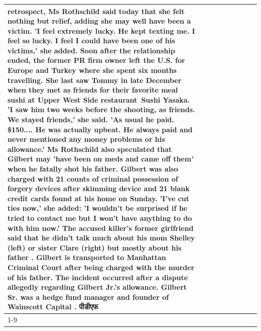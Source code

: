 \begin{table}[H]
\begin{tabular}{lllrlllll}
retrospect, Ms Rothschild said today that she felt nothing but relief, adding she may well have been a victim. 'I feel extremely lucky. He kept texting me. I feel so lucky. I feel I could have been one of his victims,' she added. Soon after the relationship ended, the former PR firm owner left the U.S. for Europe and Turkey where she spent six months  travelling. She last saw Tommy in late December when they met as friends for their favorite meal sushi at Upper West Side restaurant Sushi Yasaka. 'I saw him two weeks before the shooting, as friends. We stayed friends,' she said. 'As usual he paid. \$150.... He was actually upbeat. He always paid and never mentioned any money problems or his allowance.' Ms Rothschild also speculated that Gilbert may 'have been on meds and came off them' when he fatally shot his father. Gilbert was also charged with 21 counts of criminal possession of forgery devices after skimming device and 21 blank credit cards found at his home on Sunday. 'I've cut ties now,' she added: 'I wouldn’t be surprised if he tried to contact me but I won’t have anything to do with him now.' The accused killer's former girlfriend said that he didn't talk much about his mom Shelley (left) or sister Clare (right) but mostly about his father . Gilbert is transported to Manhattan Criminal Court  after being charged with the murder of his father. The incident occurred after a dispute allegedly regarding Gilbert Jr.'s allowance. Gilbert Sr. was a hedge fund manager and founder of Wainscott Capital . पीडीएफ \\
\cline{1-9}

\end{tabular}
\end{table}
